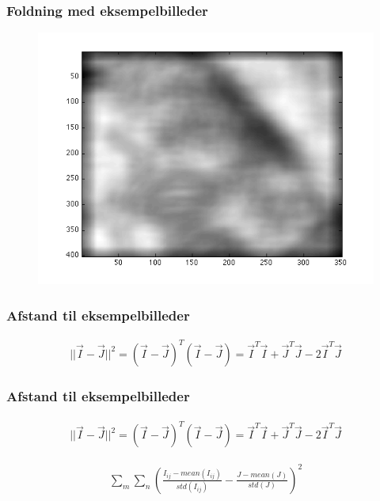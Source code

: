 \begin{frame}
\frametitle{Foldning med eksempelbilleder}
\begin{figure}[H]
	\centering
	\includegraphics[scale=0.6]{img/finalmethod/convolve.png}
\end{figure}
\end{frame}

\begin{frame}
\frametitle{Afstand til eksempelbilleder}
\begin{align*}
	||\vec{I}-\vec{J}||^2 = (\vec{I}-\vec{J})^T(\vec{I}-\vec{J}) = \vec{I}^T\vec{I} + \vec{J}^T\vec{J}-2\vec{I}^T\vec{J}
\end{align*}
\end{frame}

\begin{frame}
\frametitle{Afstand til eksempelbilleder}
\begin{align*}
	||\vec{I}-\vec{J}||^2 = (\vec{I}-\vec{J})^T(\vec{I}-\vec{J}) = \vec{I}^T\vec{I} + \vec{J}^T\vec{J}-2\vec{I}^T\vec{J}
\end{align*}

\begin{align*}
	\sum_m\sum_n \left(\frac{I_{ij}-mean(I_{ij})}{std(I_{ij})}-\frac{J-mean(J)}{std(J)}\right)^2
\end{align*}
\end{frame}